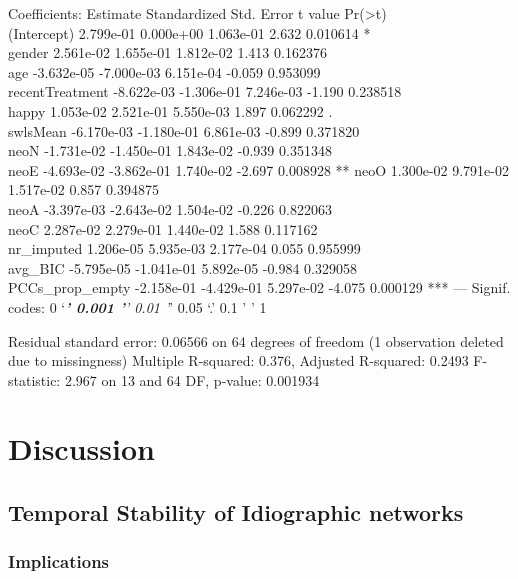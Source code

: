 \documentclass[
  english,
  man]{apa6}
\begin{document}
Coefficients:
Estimate Standardized Std. Error t value Pr(\textgreater\textbar t\textbar)\\
(Intercept) 2.799e-01 0.000e+00 1.063e-01 2.632 0.010614 *\\
gender 2.561e-02 1.655e-01 1.812e-02 1.413 0.162376\\
age -3.632e-05 -7.000e-03 6.151e-04 -0.059 0.953099\\
recentTreatment -8.622e-03 -1.306e-01 7.246e-03 -1.190 0.238518\\
happy 1.053e-02 2.521e-01 5.550e-03 1.897 0.062292 .\\
swlsMean -6.170e-03 -1.180e-01 6.861e-03 -0.899 0.371820\\
neoN -1.731e-02 -1.450e-01 1.843e-02 -0.939 0.351348\\
neoE -4.693e-02 -3.862e-01 1.740e-02 -2.697 0.008928 **
neoO 1.300e-02 9.791e-02 1.517e-02 0.857 0.394875\\
neoA -3.397e-03 -2.643e-02 1.504e-02 -0.226 0.822063\\
neoC 2.287e-02 2.279e-01 1.440e-02 1.588 0.117162\\
nr\_imputed 1.206e-05 5.935e-03 2.177e-04 0.055 0.955999\\
avg\_BIC -5.795e-05 -1.041e-01 5.892e-05 -0.984 0.329058\\
PCCs\_prop\_empty -2.158e-01 -4.429e-01 5.297e-02 -4.075 0.000129 ***
---
Signif. codes: 0 `\emph{\textbf{' 0.001 '}' 0.01 '}' 0.05 `.' 0.1 ' ' 1

Residual standard error: 0.06566 on 64 degrees of freedom
(1 observation deleted due to missingness)
Multiple R-squared: 0.376, Adjusted R-squared: 0.2493
F-statistic: 2.967 on 13 and 64 DF, p-value: 0.001934

\hypertarget{discussion}{%
\section{Discussion}\label{discussion}}

\hypertarget{temporal-stability-of-idiographic-networks}{%
\subsection{Temporal Stability of Idiographic networks}\label{temporal-stability-of-idiographic-networks}}

\hypertarget{implications}{%
\subsubsection{Implications}\label{implications}}
\end{document}
